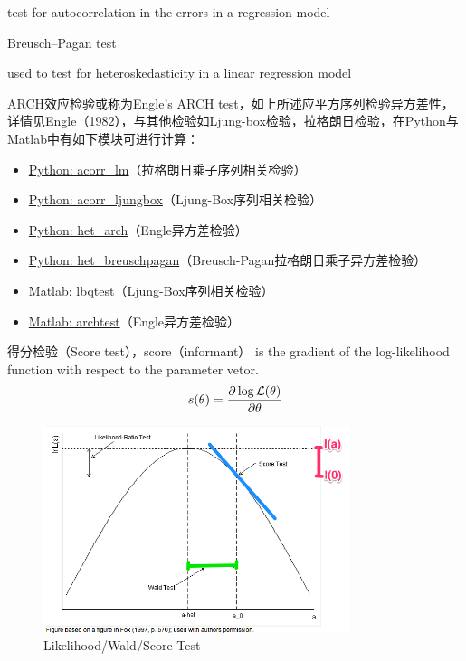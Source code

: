 \documentclass[11pt]{article}
\begin{document}
test for autocorrelation in the errors in a regression model

Breusch–Pagan test

used to test for heteroskedasticity in a linear regression model

\begin{remark}
    ARCH效应检验或称为Engle's ARCH test，如上所述应平方序列检验异方差性，详情见Engle（1982），与其他检验如Ljung-box检验，拉格朗日检验，在Python与Matlab中有如下模块可进行计算：
    \begin{itemize}
        \item \href{https://www.statsmodels.org/stable/generated/statsmodels.stats.diagnostic.acorr_lm.html}{Python: acorr\_lm}（拉格朗日乘子序列相关检验）
        \item \href{https://www.statsmodels.org/stable/generated/statsmodels.stats.diagnostic.acorr\_ljungbox.html}{Python: acorr\_ljungbox}（Ljung-Box序列相关检验）
        \item \href{https://www.statsmodels.org/stable/generated/statsmodels.stats.diagnostic.het\_arch.html}{Python: het\_arch}（Engle异方差检验）
        \item \href{https://www.statsmodels.org/stable/generated/statsmodels.stats.diagnostic.het\_breuschpagan.html}{Python: het\_breuschpagan}（Breusch-Pagan拉格朗日乘子异方差检验）
        \item \href{https://www.mathworks.com/help/econ/lbqtest.html}{Matlab: lbqtest}（Ljung-Box序列相关检验）
        \item \href{https://www.mathworks.com/help/econ/archtest.html}{Matlab: archtest}（Engle异方差检验）
    \end{itemize}
\end{remark}

得分检验（Score test），score（informant） is the gradient of the log-likelihood function with respect to the parameter vetor.
\begin{equation*}
    s(\theta) = \frac{\partial \log \mathcal{L}(\theta)}{\partial \theta}
\end{equation*}

\begin{figure}[ht!]
    \centering
    \includegraphics[width=0.8\textwidth]{fig/W-L-S-test.png}
    \caption{Likelihood/Wald/Score Test}
\end{figure}
\end{document}
